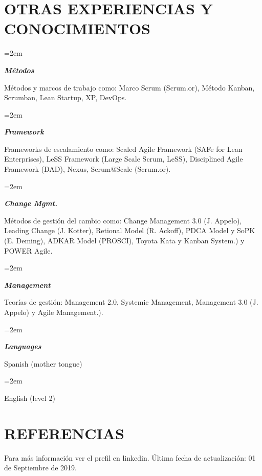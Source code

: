 \documentclass[paper=a4,fontsize=11pt]{scrartcl} %
\newlength{\spacebox}
\newcommand{\sepspace}{\vspace*{1em}}		%
\newcommand{\NewPart}[1]{\section*{\uppercase{#1}}}
\newcommand{\PersonalEntry}[2]{
		\noindent\hangindent=2em\hangafter=0 %
		\parbox{\spacebox}{        %
		\textit{#1}}		       %
		\hspace{1.5em} #2 \par}    %
\newcommand{\SkillsEntry}[2]{      %
		\noindent\hangindent=2em\hangafter=0 %
		\parbox{\spacebox}{        %
		\textit{#1}}			   %
		\hspace{1.5em} #2 \par}    %
\begin{document}
\NewPart{Otras Experiencias y Conocimientos}{}

\sepspace

\SkillsEntry{\textbf{Métodos}}{Métodos y marcos de trabajo como: Marco Scrum (Scrum.or), Método Kanban, Scrumban, Lean Startup, XP, DevOps.
}
\sepspace

\SkillsEntry{\textbf{Framework}}{Frameworks de escalamiento como: Scaled Agile Framework (SAFe for Lean Enterprises), LeSS Framework (Large Scale Scrum, LeSS), Disciplined Agile Framework  (DAD), Nexus, Scrum@Scale (Scrum.or).
}
\sepspace

\SkillsEntry{\textbf{Change Mgmt.}}{Métodos de gestión del cambio como: Change Management 3.0 (J. Appelo), Leading Change (J. Kotter), Retional Model (R. Ackoff), PDCA Model y SoPK (E. Deming), ADKAR Model (PROSCI), Toyota Kata y Kanban System.) y POWER Agile.
}
\sepspace

\SkillsEntry{\textbf{Management}}{Teorías de gestión: Management 2.0, Systemic Management, Management 3.0 (J. Appelo) y Agile Management.).
}
\sepspace

\SkillsEntry{\textbf{Languages}}{Spanish (mother tongue)}
\SkillsEntry{}{English (level 2)}

\sepspace




\NewPart{Referencias}{}
Para más información ver el prefil en linkedin.
Última fecha de actualización: 01 de Septiembre de 2019.
\sepspace
\end{document}
